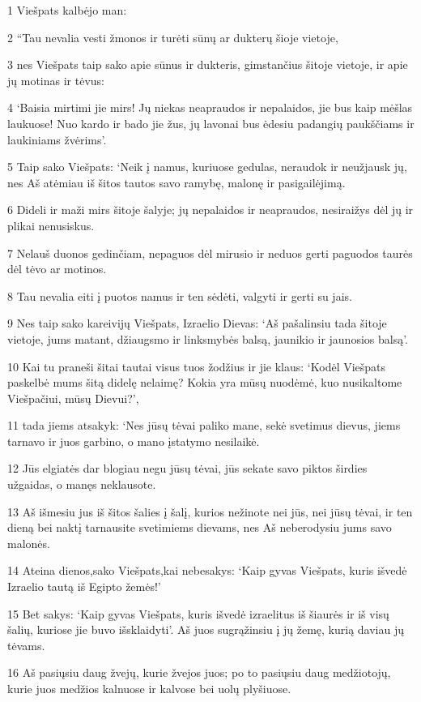 \par 1 Viešpats kalbėjo man: 
\par 2 “Tau nevalia vesti žmonos ir turėti sūnų ar dukterų šioje vietoje, 
\par 3 nes Viešpats taip sako apie sūnus ir dukteris, gimstančius šitoje vietoje, ir apie jų motinas ir tėvus: 
\par 4 ‘Baisia mirtimi jie mirs! Jų niekas neapraudos ir nepalaidos, jie bus kaip mėšlas laukuose! Nuo kardo ir bado jie žus, jų lavonai bus ėdesiu padangių paukščiams ir laukiniams žvėrims’. 
\par 5 Taip sako Viešpats: ‘Neik į namus, kuriuose gedulas, neraudok ir neužjausk jų, nes Aš atėmiau iš šitos tautos savo ramybę, malonę ir pasigailėjimą. 
\par 6 Dideli ir maži mirs šitoje šalyje; jų nepalaidos ir neapraudos, nesiraižys dėl jų ir plikai nenusiskus. 
\par 7 Nelauš duonos gedinčiam, nepaguos dėl mirusio ir neduos gerti paguodos taurės dėl tėvo ar motinos. 
\par 8 Tau nevalia eiti į puotos namus ir ten sėdėti, valgyti ir gerti su jais. 
\par 9 Nes taip sako kareivijų Viešpats, Izraelio Dievas: ‘Aš pašalinsiu tada šitoje vietoje, jums matant, džiaugsmo ir linksmybės balsą, jaunikio ir jaunosios balsą’. 
\par 10 Kai tu praneši šitai tautai visus tuos žodžius ir jie klaus: ‘Kodėl Viešpats paskelbė mums šitą didelę nelaimę? Kokia yra mūsų nuodėmė, kuo nusikaltome Viešpačiui, mūsų Dievui?’, 
\par 11 tada jiems atsakyk: ‘Nes jūsų tėvai paliko mane, sekė svetimus dievus, jiems tarnavo ir juos garbino, o mano įstatymo nesilaikė. 
\par 12 Jūs elgiatės dar blogiau negu jūsų tėvai, jūs sekate savo piktos širdies užgaidas, o manęs neklausote. 
\par 13 Aš išmesiu jus iš šitos šalies į šalį, kurios nežinote nei jūs, nei jūsų tėvai, ir ten dieną bei naktį tarnausite svetimiems dievams, nes Aš neberodysiu jums savo malonės. 
\par 14 Ateina dienos,­sako Viešpats,­kai nebesakys: ‘Kaip gyvas Viešpats, kuris išvedė Izraelio tautą iš Egipto žemės!’ 
\par 15 Bet sakys: ‘Kaip gyvas Viešpats, kuris išvedė izraelitus iš šiaurės ir iš visų šalių, kuriose jie buvo išsklaidyti’. Aš juos sugrąžinsiu į jų žemę, kurią daviau jų tėvams. 
\par 16 Aš pasiųsiu daug žvejų, kurie žvejos juos; po to pasiųsiu daug medžiotojų, kurie juos medžios kalnuose ir kalvose bei uolų plyšiuose. 
